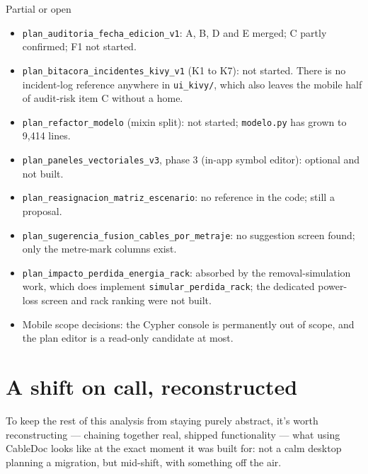 \documentclass[10.4pt,twocolumn]{article}
\begin{document}
\begin{specbox}{Partial or open}
\begin{itemize}[leftmargin=1.0em,itemsep=1pt,topsep=2pt]
\item \texttt{plan\_auditoria\_fecha\_edicion\_v1}: A, B, D and E merged; C partly confirmed; F1 not started.
\item \texttt{plan\_bitacora\_incidentes\_kivy\_v1} (K1 to K7): not started. There is no incident-log reference anywhere in \texttt{ui\_kivy/}, which also leaves the mobile half of audit-risk item C without a home.
\item \texttt{plan\_refactor\_modelo} (mixin split): not started; \texttt{modelo.py} has grown to 9{,}414 lines.
\item \texttt{plan\_paneles\_vectoriales\_v3}, phase 3 (in-app symbol editor): optional and not built.
\item \texttt{plan\_reasignacion\_matriz\_escenario}: no reference in the code; still a proposal.
\item \texttt{plan\_sugerencia\_fusion\_cables\_por\_metraje}: no suggestion screen found; only the metre-mark columns exist.
\item \texttt{plan\_impacto\_perdida\_energia\_rack}: absorbed by the removal-simulation work, which does implement \texttt{simular\_perdida\_rack}; the dedicated power-loss screen and rack ranking were not built.
\item Mobile scope decisions: the Cypher console is permanently out of scope, and the plan editor is a read-only candidate at most.
\end{itemize}
\end{specbox}


\section{A shift on call, reconstructed}

To keep the rest of this analysis from staying purely abstract, it's worth reconstructing --- chaining together real, shipped functionality --- what using CableDoc looks like at the exact moment it was built for: not a calm desktop planning a migration, but mid-shift, with something off the air.
\end{document}
